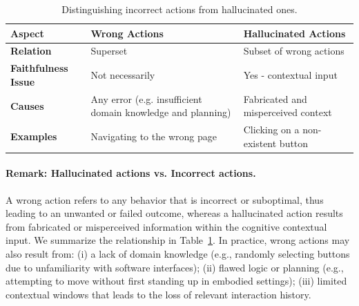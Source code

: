 \begin{table} 
    \centering
    \footnotesize
    \begin{tabularx}{\linewidth}{>{\raggedright\arraybackslash\bfseries}p{1.4cm} X X}
        \toprule
        Aspect & \textbf{Wrong Actions} & \textbf{Hallucinated Actions} \\
        \midrule
        Relation & Superset & Subset of wrong actions \\
        \midrule
        Faithfulness Issue & Not necessarily & Yes - contextual input \\
        \midrule
        Causes & Any error (e.g. insufficient domain knowledge and planning) & Fabricated and misperceived context \\
        \midrule
        Examples & Navigating to the wrong page & Clicking on a non-existent button \\
        \bottomrule
    \end{tabularx}
    \caption{Distinguishing incorrect actions from hallucinated ones.}
    \label{tab:wrong_vs_hallu}
    \vspace{-3mm}
\end{table}


\paragraph{Remark: Hallucinated actions vs. Incorrect actions.}
A wrong action refers to any behavior that is incorrect or suboptimal, thus leading to an unwanted or failed outcome, whereas a hallucinated action results from fabricated or misperceived information within the cognitive contextual input.
We summarize the relationship in Table~\ref{tab:wrong_vs_hallu}. In practice, wrong actions may also result from: (i) a lack of domain knowledge (e.g., randomly selecting buttons due to unfamiliarity with software interfaces); (ii) flawed logic or planning (e.g., attempting to move without first standing up in embodied settings); (iii) limited contextual windows that leads to the loss of relevant interaction history.


